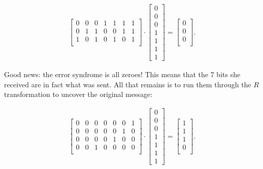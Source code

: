 \begin{alttitles}
\vspace{-.15in}
\begin{align*}
\begin{bmatrix}
0 & 0 & 0 & 1 & 1 & 1 & 1 \\
0 & 1 & 1 & 0 & 0 & 1 & 1 \\
1 & 0 & 1 & 0 & 1 & 0 & 1 \\
\end{bmatrix} \cdot
\begin{bmatrix}
0 \\ 0 \\ 0 \\ 1 \\ 1 \\ 1 \\ 1
\end{bmatrix} =
\begin{bmatrix}
0 \\ 0 \\ 0 \\
\end{bmatrix}.
\end{align*}
\vspace{-.15in}

Good news: the error syndrome is all zeroes! This means that the 7 bits she
received are in fact what was sent. All that remains is to run them through the
$R$ transformation to uncover the original message:

\vspace{-.15in}
\begin{align*}
\begin{bmatrix}
0 & 0 & 0 & 0 & 0 & 0 & 1 \\
0 & 0 & 0 & 0 & 0 & 1 & 0 \\
0 & 0 & 0 & 0 & 1 & 0 & 0 \\
0 & 0 & 1 & 0 & 0 & 0 & 0 \\
\end{bmatrix} \cdot
\begin{bmatrix}
0 \\ 0 \\ 0 \\ 1 \\ 1 \\ 1 \\ 1
\end{bmatrix} =
\begin{bmatrix}
1 \\ 1 \\ 1 \\ 0 \\
\end{bmatrix}.
\end{align*}
\vspace{-.15in}


\end{alttitles}
